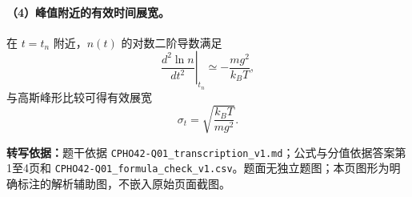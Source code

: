 \paragraph{（4）峰值附近的有效时间展宽。}
在 $t=t_n$ 附近，$n(t)$ 的对数二阶导数满足
\[\left.\frac{d^2\ln n}{dt^2}\right|_{t_n}\simeq-\frac{mg^2}{k_BT},\]
与高斯峰形比较可得有效展宽
\[\boxed{\sigma_t=\sqrt{\frac{k_BT}{mg^2}}}.\]
\par\smallskip\noindent\textbf{转写依据：}题干依据 \texttt{CPHO42-Q01\_transcription\_v1.md}；公式与分值依据答案第1至4页和 \texttt{CPHO42-Q01\_formula\_check\_v1.csv}。题面无独立题图；本页图形为明确标注的解析辅助图，不嵌入原始页面截图。

